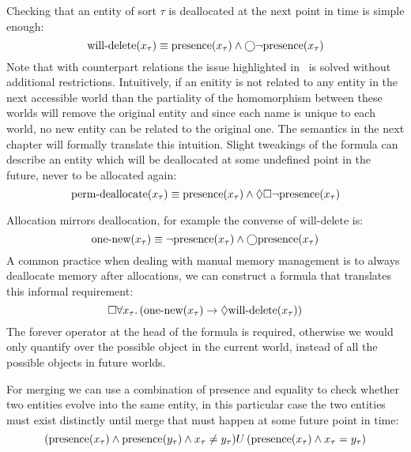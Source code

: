 \begin{example}[Deallocation]
  Checking that an entity of sort $\tau$ is deallocated at the next point in time is simple enough:
  \[\text{will-delete}(x_\tau) \equiv \text{presence}(x_\tau) \land \bigcirc{\neg\text{presence}(x_\tau)}\] Note that with
  counterpart relations the issue highlighted in~ is solved without additional restrictions.
  Intuitively, if an enitity is not related to any entity in the next accessible world than the partiality of the
  homomorphism between these worlds will remove the original entity and since each name is unique to each world, no new
  entity can be related to the original one. The semantics in the next chapter will formally translate this intuition.
  Slight tweakings of the formula can describe an entity which will be deallocated at some undefined point in the
  future, never to be allocated again: \[\text{perm-deallocate}(x_\tau) \equiv \text{presence}(x_\tau) \land
  \Diamond{\Box{\neg\text{presence}(x_\tau)}}\]
\end{example}
\begin{example}[Allocation]
  Allocation mirrors deallocation, for example the converse of $\text{will-delete}$ is: \[\text{one-new}(x_\tau) \equiv
  \neg\text{presence}(x_\tau) \land \bigcirc{\text{presence}(x_\tau)}\] A common practice when dealing with manual memory management
  is to always deallocate memory after allocations, we can construct a formula that translates this informal
  requirement: \[\Box{\forall {x_\tau} \ldotp {(\text{one-new}(x_\tau) \to
  \Diamond{\text{will-delete}(x_\tau)})}}\] The forever operator at the head of the formula is required, otherwise we
  would only quantify over the possible object in the current world, instead of all the possible objects in future
  worlds.
\end{example}
\begin{example}[Merge]
  For merging we can use a combination of $\text{presence}$ and equality to check whether two entities evolve into the
  same entity, in this particular case the two entities must exist distinctly until merge that must happen at some
  future point in time:
  \[
    {(\text{presence}(x_\tau) \land
  \text{presence}(y_\tau) \land x_\tau \neq y_\tau)}U\,{(\text{presence}(x_\tau) \land x_\tau
  = y_\tau)}\]
\end{example}
